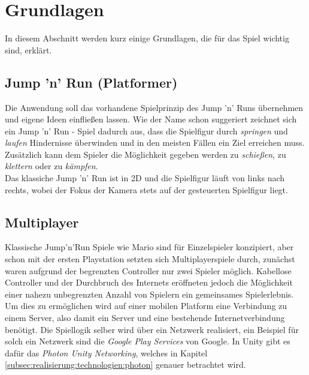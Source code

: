 \chapter{Grundlagen}
\label{cha:grundlagen}
In diesem Abschnitt werden kurz einige Grundlagen, die für das Spiel wichtig sind, erklärt. 

\section{Jump 'n' Run (Platformer)}
\label{sec:grundlagen:jumpnrun}
Die Anwendung soll das vorhandene Spielprinzip des Jump 'n' Runs übernehmen und eigene Ideen einfließen lassen. Wie der Name schon suggeriert zeichnet sich ein Jump 'n' Run - Spiel dadurch aus, dass die Spielfigur durch \textit{springen} und \textit{laufen} Hindernisse überwinden und in den meisten Fällen ein Ziel erreichen muss. Zusätzlich kann dem Spieler die Möglichkeit gegeben werden zu \textit{schießen}, zu \textit{klettern} oder zu \textit{kämpfen}. \\
Das klassiche Jump 'n' Run ist in 2D und die Spielfigur läuft von links nach rechts, wobei der Fokus der Kamera stets auf der gesteuerten Spielfigur liegt. 


\section{Multiplayer}
\label{sec:grundlagen:multiplayer}
Klassische Jump'n'Run Spiele wie Mario sind für Einzelspieler konzipiert, aber schon mit der ersten Playstation \cite{playstation} setzten sich Multiplayerspiele durch, zunächst waren aufgrund der begrenzten Controller nur zwei Spieler möglich. Kabellose Controller und der Durchbruch des Internets eröffneten jedoch die Möglichkeit einer nahezu unbegrenzten Anzahl von Spielern ein gemeinsames Spielerlebnis. \\
Um dies zu ermöglichen wird auf einer mobilen Platform eine Verbindung zu einem Server, also damit ein Server und eine bestehende Internetverbindung benötigt. Die Spiellogik selber wird über ein Netzwerk realisiert, ein Beispiel für solch ein Netzwerk sind die \textit{Google Play Services} \cite{googleplayservices} von Google. In Unity gibt es dafür das \textit{Photon Unity Networking}, welches in Kapitel \ref{subsec:realisierung:technologien:photon} genauer betrachtet wird.


